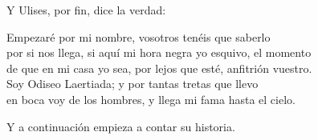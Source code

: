 Y Ulises, por fin, dice la verdad:

\begin{versocita}
Empezaré por mi nombre, vosotros tenéis que saberlo\\
por si nos llega, si aquí mi hora negra yo esquivo, el momento\\
de que en mi casa yo sea, por lejos que esté, anfitrión vuestro.\\
Soy Odiseo Laertiada; y por tantas tretas que llevo\\
en boca voy de los hombres, y llega mi fama hasta el cielo.
\end{versocita}

Y a continuación empieza a contar su historia.
